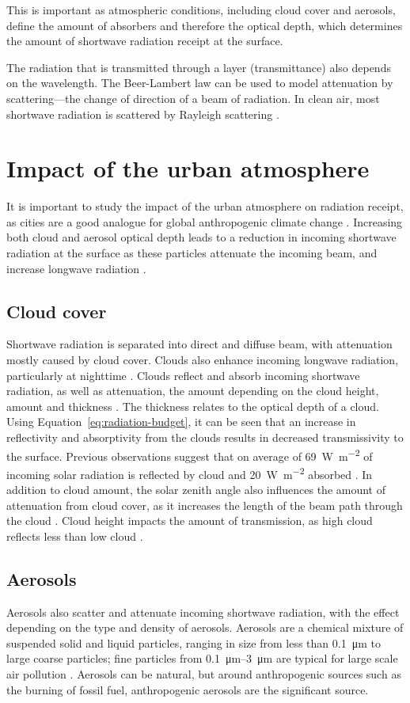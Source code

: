 \documentclass[a4paper,titlepage, twoside]{report}
\begin{document}
This is important as atmospheric conditions, including cloud cover and aerosols, define the amount of absorbers and therefore the optical depth, which determines the amount of shortwave radiation receipt at the surface.

The radiation that is transmitted through a layer (transmittance) also depends on the wavelength. The Beer-Lambert law can be used to model attenuation by scattering---the change of direction of a beam of radiation. In clean air, most shortwave radiation is scattered by Rayleigh scattering \parencite{chameides}.

\section{Impact of the urban atmosphere}
It is important to study the impact of the urban atmosphere on radiation receipt, as cities are a good analogue for global anthropogenic climate change \parencite{cleugh}.  Increasing both cloud and aerosol optical depth leads to a reduction in incoming shortwave radiation at the surface as these particles attenuate the incoming beam, and increase longwave radiation \parencite{ipcc}.

\subsection{Cloud cover}
Shortwave radiation is separated into direct and diffuse beam, with attenuation mostly caused by cloud cover. Clouds also enhance incoming longwave radiation, particularly at nighttime \parencite{kotthaus1}.  Clouds reflect and absorb incoming shortwave radiation, as well as attenuation, the amount depending on the cloud height, amount and thickness \parencite{iqbal}.  The thickness relates to the optical depth of a cloud. Using Equation~\ref{eq:radiation-budget}, it can be seen that an increase in reflectivity and absorptivity from the clouds results in decreased transmissivity to the surface. Previous observations suggest that on average of \SI{69}{\watt\per\meter\squared} of incoming solar radiation is reflected by cloud and \SI{20}{\watt\per\meter\squared} absorbed \parencite{salby}.  In addition to cloud amount, the solar zenith angle also influences the amount of attenuation from cloud cover, as it increases the length of the beam path through the cloud \parencite{oke}.  Cloud height impacts the amount of transmission, as high cloud reflects less than low cloud \parencite{liou}.

\subsection{Aerosols}
Aerosols also scatter and attenuate incoming shortwave radiation, with the effect depending on the type and density of aerosols. Aerosols are a chemical mixture of suspended solid and liquid particles, ranging in size from less than \SI{0.1}{\micro\meter} to large coarse particles; fine particles from \SIrange{0.1}{3}{\micro\meter} are typical for large scale air pollution \parencite{chameides}.  Aerosols can be natural, but around anthropogenic sources such as the burning of fossil fuel, anthropogenic aerosols are the significant source. 
\end{document}
